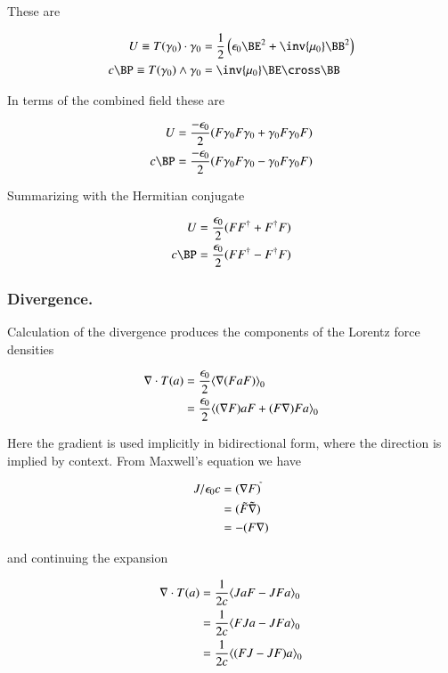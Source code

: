 These are

\begin{align}
U \equiv T(\gamma_0) \cdot \gamma_0 &= \frac{1}{2} \left( \epsilon_0 \BE^2 + \inv{\mu_0} \BB^2 \right) \\
c \BP \equiv T(\gamma_0) \wedge \gamma_0 &= \inv{\mu_0} \BE \cross \BB
\end{align}

In terms of the combined field these are

\begin{align}
U &= \frac{-\epsilon_0}{2}( F \gamma_0 F \gamma_0 + \gamma_0 F \gamma_0 F) \\
c \BP &= \frac{-\epsilon_0}{2}( F \gamma_0 F \gamma_0 - \gamma_0 F \gamma_0 F)
\end{align}

Summarizing with the Hermitian conjugate

\begin{align}
U &= \frac{\epsilon_0}{2}( F F^\dagger + F^\dagger F) \\
c \BP &= \frac{\epsilon_0}{2}( F F^\dagger - F^\dagger F)
\end{align}

\subsubsection{Divergence. }

Calculation of the divergence produces the components of the Lorentz force densities

\begin{align*}
\nabla \cdot T(a)
&= \frac{\epsilon_0}{2} {\left\langle{{ \nabla(F a F) }}\right\rangle}_{0} \\
&= \frac{\epsilon_0}{2} {\left\langle{{ (\nabla F) a F + (F \nabla) F a }}\right\rangle}_{0} \\
\end{align*}

Here the gradient is used implicitly in bidirectional form, where the direction is implied by context.  From Maxwell's equation we have

\begin{align*}
J/\epsilon_0 c
&= (\nabla F)^{\tilde{}} \\
&= (\tilde{F} \tilde{\nabla}) \\
&= -(F \nabla)
\end{align*}

and continuing the expansion

\begin{align*}
\nabla \cdot T(a)
&= \frac{1}{2c} {\left\langle{{ J a F - J F a }}\right\rangle}_{0} \\
&= \frac{1}{2c} {\left\langle{{ F J a - J F a }}\right\rangle}_{0} \\
&= \frac{1}{2c} {\left\langle{{ (F J - J F) a }}\right\rangle}_{0} \\
\end{align*}

